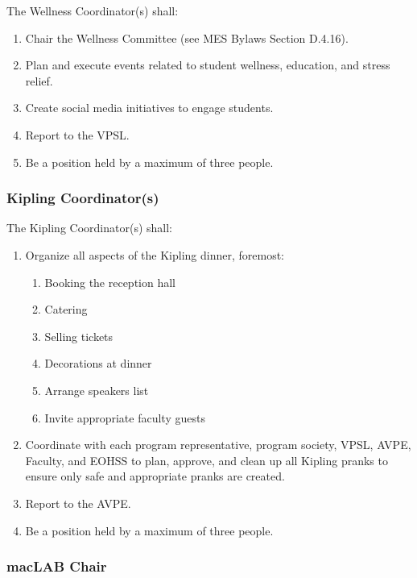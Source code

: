 The Wellness Coordinator(s) shall:

\begin{enumerate}
 \item
  Chair the Wellness Committee (see MES Bylaws Section D.4.16).
 \item
  Plan and execute events related to student wellness, education, and
  stress relief.
 \item
  Create social media initiatives to engage students.
 \item
  Report to the VPSL.
 \item
  Be a position held by a maximum of three people.

\end{enumerate}

\hypertarget{kipling-coordinators}{%
 \subsubsection{Kipling Coordinator(s)}
 \label{kipling-coordinators}}

The Kipling Coordinator(s) shall:

\begin{enumerate}
 \item
  Organize all aspects of the Kipling dinner, foremost:

  \begin{enumerate}
   \item
    Booking the reception hall
   \item
    Catering
   \item
    Selling tickets
   \item
    Decorations at dinner
   \item
    Arrange speakers list
   \item
    Invite appropriate faculty guests
  \end{enumerate}
 \item
  Coordinate with each program representative, program society, VPSL,
  AVPE, Faculty, and EOHSS to plan, approve, and clean up all Kipling
  pranks to ensure only safe and appropriate pranks are created.
 \item
  Report to the AVPE.
 \item
  Be a position held by a maximum of three people.

\end{enumerate}
\hypertarget{maclab-chair}{%
 \subsubsection{macLAB Chair}
 \label{maclab-chair}}


